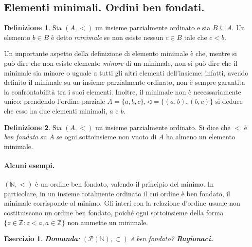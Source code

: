 \documentclass[fontsize = 11 pt, paper=A4, oneside, index=totoc, hyperref]{article}
\theoremstyle{definition}
\newtheorem{dfn}{Definizione}[section]
\theoremstyle{plain}
\newtheorem{exe}{Esercizio}[section]
\newcommand{\N}{\mathbb{N}}
\begin{document}
\subsection{Elementi minimali. Ordini ben fondati.}
\begin{dfn}
  Sia \((A, <)\) un insieme parzialmente ordinato e sia \(B \subseteq A\). Un elemento \(b \in B\) è detto \emph{minimale} se non esiste nessun \(c \in B\) tale che \(c < b\).
\end{dfn}
Un importante aspetto della definizione di elemento minimale è che, mentre si può dire che non esiste elemento \emph{minore} di un minimale, non si può dire che il minimale sia minore o uguale a tutti gli altri elementi dell'insieme: infatti, avendo definito il minimale su un insieme parzialmente ordinato, non è sempre garantita la confrontabilità tra i suoi elementi. Inoltre, il minimale non è necessariamente unico: prendendo l'ordine parziale \(A = \lbrace a,b,c \rbrace, \lhd = \lbrace (a,b), (b,c) \rbrace\) si deduce che esso ha due elementi minimali, \(a\) e \(b\).

\begin{dfn}
  Sia \((A,<)\) un insieme parzialmente ordinato. Si dice che \(<\) è \emph{ben fondata} su \(A\) se ogni sottoinsieme non vuoto di \(A\) ha almeno un elemento minimale.
\end{dfn}

\paragraph{Alcuni esempi.} \((\N, <)\) è un ordine ben fondato, valendo il principio del minimo. In particolare, in un insieme totalmente ordinato il cui ordine è ben fondato, il minimale corrisponde al minimo. Gli interi con la relazione d'ordine usuale non costituiscono un ordine ben fondato, poiché ogni sottoinsieme della forma \(\lbrace z \in \mathbb{Z} \colon z < a, a \in \mathbb{Z}\rbrace\) non ammette un minimale.

\begin{exe}
{\bf Domanda}: \((\mathcal{P}(\N), \subset)\) è ben fondato?
{\bf Ragionaci.}
\end{exe}
\end{document}
